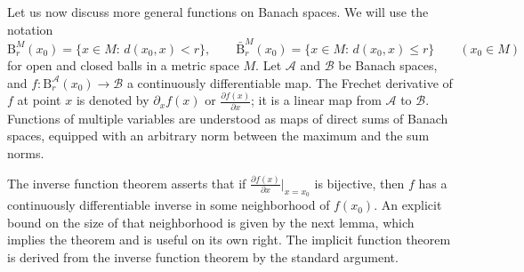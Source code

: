 \documentclass[12pt]{article}
\newcommand{\calA}{\mathcal{A}}
\newcommand{\calB}{\mathcal{B}}
\newcommand{\Ba}{\mathrm{B}}
\renewcommand{\le}{\leqslant}
\newtheorem[definition]{Definition}[Theorem]{Definition}
\newtheorem[remark]{Example}[Theorem]{Example}
\newtheorem[remark]{Remark}[Theorem]{Remark}
\newtheorem[remark]{Question}[Theorem]{Open question}
\newtheorem*[definition]{definition}{Definition}
\newtheorem*[remark]{example}{Example}
\newtheorem*[remark]{remark}{Remark}
\newtheorem*[remark]{question}{Open question}
\numberwithin{equation}{section}
\begin{document}
Let us now discuss more general functions on Banach spaces. We will use the notation
\begin{equation}
\Ba^M_r(x_0)=\{x\in M:\,d(x_0,x)<r\},\qquad
\bar{\Ba}^M_r(x_0)=\{x\in M:\,d(x_0,x)\le r\}\qquad
(x_0\in M)
\end{equation}
for open and closed balls in a metric space $M$. Let $\calA$ and $\calB$ be Banach spaces, and $f\colon \Ba^\calA_r(x_0)\to\calB$ a continuously differentiable map. The Frechet derivative of $f$ at point $x$ is denoted by $\partial_{x}f(x)$ or $\frac{\partial f(x)}{\partial x}$; it is a linear map from $\calA$ to $\calB$. Functions of multiple variables are understood as maps of direct sums of Banach spaces, equipped with an arbitrary norm between the maximum and the sum norms.

The inverse function theorem asserts that if $\frac{\partial f(x)}{\partial x}\big|_{x=x_0}$ is bijective, then $f$ has a continuously differentiable inverse in some neighborhood of $f(x_0)$. An explicit bound on the size of that neighborhood is given by the next lemma, which implies the theorem and is useful on its own right. The implicit function theorem is derived from the inverse function theorem by the standard argument.
\end{document}
